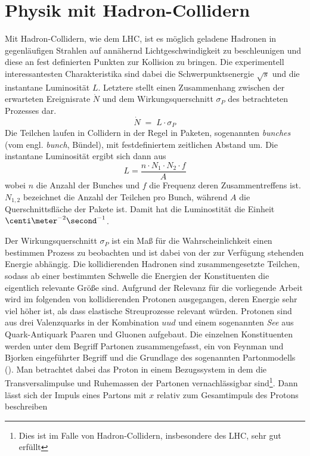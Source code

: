 \section{Physik mit Hadron-Collidern}
\label{theory:hadron_collider}


Mit Hadron-Collidern, wie dem \ac{LHC}, ist es möglich geladene Hadronen in
gegenläufigen Strahlen auf annähernd Lichtgeschwindigkeit zu beschleunigen und
diese an fest definierten Punkten zur Kollision zu bringen. Die experimentell
interessantesten Charakteristika sind dabei die Schwerpunktsenergie $\sqrt{s}$
und die instantane Luminosität $L$. Letztere stellt einen Zusammenhang zwischen
der erwarteten Ereignisrate $\dot N$ und dem Wirkungsquerschnitt $\sigma_P$ des
betrachteten Prozesses dar.
\begin{equation}
    \dot N \;=\; L \cdot \sigma_P
\end{equation}
Die Teilchen laufen in Collidern in der Regel in Paketen, sogenannten
\textit{bunches} (vom engl. \textit{bunch}, Bündel), mit festdefiniertem
zeitlichen Abstand um. Die instantane Luminosität ergibt sich dann aus
\begin{equation}
    L = \frac{n \cdot N_1 \cdot  N_2 \cdot f}{A}
    \label{eq:collider_lumi}
\end{equation}
wobei $n$ die Anzahl der Bunches und $f$ die Frequenz deren Zusammentreffens
ist. $N_{1,2}$ bezeichnet die Anzahl der Teilchen pro Bunch, während $A$ die
Querschnittsfläche der Pakete ist. Damit hat die Luminostität die Einheit
$\centi\meter^{-2}\second^{-1}$.

Der Wirkungsquerschnitt $\sigma_P$ ist ein Maß für die Wahrscheinlichkeit einen
bestimmen Prozess zu beobachten und ist dabei von der zur Verfügung stehenden
Energie abhängig. Die kollidierenden Hadronen sind zusammengesetzte Teilchen,
sodass ab einer bestimmten Schwelle die Energien der Konstituenten die
eigentlich relevante Größe sind. Aufgrund der Relevanz für die vorliegende
Arbeit wird im folgenden von kollidierenden Protonen ausgegangen, deren Energie
sehr viel höher ist, als dass elastische Streuprozesse relevant würden.
Protonen sind aus drei Valenzquarks in der Kombination $uud$ und einem
sogenannten \textit{See} aus Quark-Antiquark Paaren und Gluonen aufgebaut. Die
einzelnen Konstituenten werden unter dem Begriff Partonen zusammengefasst, ein
von Feynman und Bjorken eingeführter Begriff und die Grundlage des sogenannten
Partonmodells (\cite{Bjorken:1968dy}). Man betrachtet dabei das Proton in einem
Bezugssystem in dem die Transversalimpulse und Ruhemassen der Partonen
vernachlässigbar sind\footnote{Dies ist im Falle von Hadron-Collidern,
insbesondere des \ac{LHC}, sehr gut erfüllt}. Dann lässt sich der Impuls eines
Partons mit $x$ relativ zum Gesamtimpuls des Protons beschreiben

